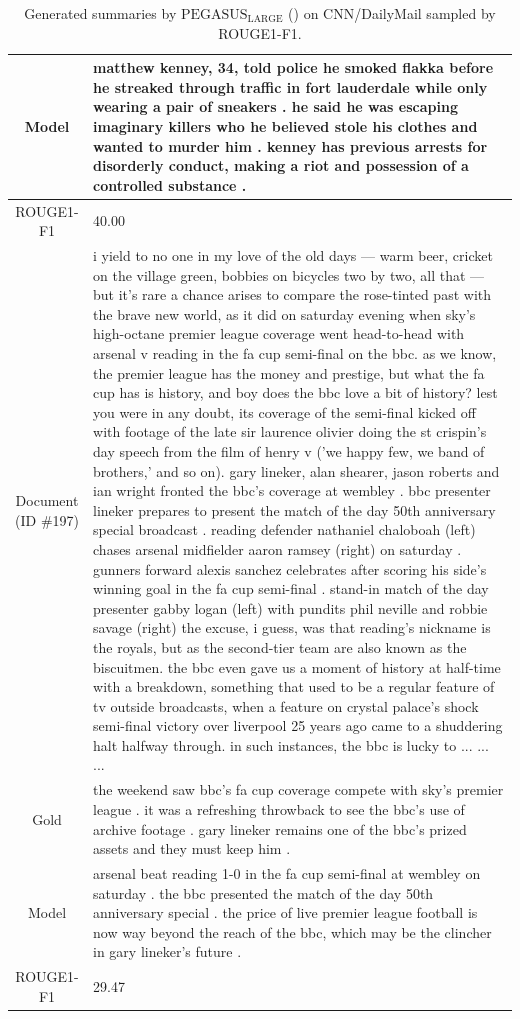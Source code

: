 \begin{table}[bth!]
\begin{tabular}{c|p{}}
\\ \hline
Model & 
matthew kenney, 34, told police he smoked flakka before he streaked through traffic in fort lauderdale while only wearing a pair of sneakers . he said he was escaping imaginary killers who he believed stole his clothes and wanted to murder him . kenney has previous arrests for disorderly conduct, making a riot and possession of a controlled substance .
\\ \hline
ROUGE1-F1 & 
40.00
\\ \hline
\makecell{Document\\(ID \#197)} & 
i yield to no one in my love of the old days — warm beer, cricket on the village green, bobbies on bicycles two by two, all that — but it's rare a chance arises to compare the rose-tinted past with the brave new world, as it did on saturday evening when sky's high-octane premier league coverage went head-to-head with arsenal v reading in the fa cup semi-final on the bbc. as we know, the premier league has the money and prestige, but what the fa cup has is history, and boy does the bbc love a bit of history? lest you were in any doubt, its coverage of the semi-final kicked off with footage of the late sir laurence olivier doing the st crispin's day speech from the film of henry v ('we happy few, we band of brothers,' and so on). gary lineker, alan shearer, jason roberts and ian wright fronted the bbc's coverage at wembley . bbc presenter lineker prepares to present the match of the day 50th anniversary special broadcast . reading defender nathaniel chaloboah (left) chases arsenal midfielder aaron ramsey (right) on saturday . gunners forward alexis sanchez celebrates after scoring his side's winning goal in the fa cup semi-final . stand-in match of the day presenter gabby logan (left) with pundits phil neville and robbie savage (right) the excuse, i guess, was that reading's nickname is the royals, but as the second-tier team are also known as the biscuitmen. the bbc even gave us a moment of history at half-time with a breakdown, something that used to be a regular feature of tv outside broadcasts, when a feature on crystal palace's shock semi-final victory over liverpool 25 years ago came to a shuddering halt halfway through. in such instances, the bbc is lucky to ... ... ... 
\\ \hline
Gold & 
the weekend saw bbc's fa cup coverage compete with sky's premier league . it was a refreshing throwback to see the bbc's use of archive footage . gary lineker remains one of the bbc's prized assets and they must keep him .
\\ \hline
Model & 
arsenal beat reading 1-0 in the fa cup semi-final at wembley on saturday . the bbc presented the match of the day 50th anniversary special . the price of live premier league football is now way beyond the reach of the bbc, which may be the clincher in gary lineker's future .
\\ \hline
ROUGE1-F1 & 
29.47
\\ \hline
\end{tabular}
\caption{Generated summaries by $\text{PEGASUS}_{\text{LARGE}}$ (\gnews) on CNN/DailyMail sampled by ROUGE1-F1.}
\end{table}